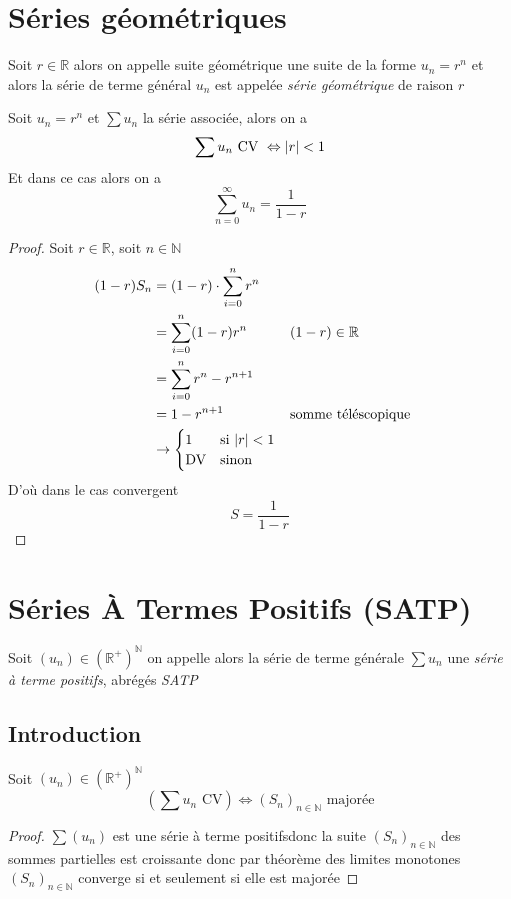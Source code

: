 \documentclass[11pt,colorlinks]{book}
\theoremstyle{mytheoremstyle}
\theoremstyle{mytheoremstyle}
\theoremstyle{mytheoremstyle}
\theoremstyle{mytheoremstyle}
\theoremstyle{mytheoremstyle}
\theoremstyle{mytheoremstyle}
\theoremstyle{mytheoremstyle}
\theoremstyle{mytheoremstyle}
\theoremstyle{myproblemstyle}
\def\mbb#1{\mathbb{#1}}
\def\bN{\mbb{N}}
\def\bR{\mbb{R}}
\def\rNp{\left(\bR^{+}\right)^{\bN}}
\def\satp{série à terme positifs}
\newcommand{\deq}[3]{\begin{cases}
    #1 & \text{si } #2 \\
    #3 & \text{sinon}
\end{cases}}
\begin{document}
\section{Séries géométriques}
\begin{definition}
  Soit $r \in \bR$ alors on appelle suite géométrique une suite de la forme $u_n = r^n$ et alors 
  la série de terme général $u_n$ est appelée \textit{série géométrique} de raison $r$
\end{definition}
\begin{theorem}
  Soit $u_n = r^n$ et $\sum u_n$ la série associée, alors on a 
  \begin{equation*}
    \sum u_n \text{ CV } \Leftrightarrow \abs{r} < 1 
  \end{equation*}
  Et dans ce cas alors on a 
  \begin{equation*}
    \sum_{n=0}^{\infty} u_n = \frac{1}{1-r}
  \end{equation*}
  \begin{proof}
    Soit $r \in \bR$, soit $n \in \bN$ 
    \begin{align*}
      (1-r)S_n &= (1-r)\cdot \sum_{i=0}^n r^n \\
               &= \sum_{i=0}^n (1-r)r^n && (1-r) \in \bR \\ 
               &= \sum_{i=0}^n r^n - r^{n+1} \\ 
               &= 1 - r^{n+1} && \text{somme téléscopique} \\
               &\to \deq{1}{\abs{r} < 1}{\text{DV}}
  \end{align*}
  D'où dans le cas convergent 
  \begin{equation*}
    S = \frac{1}{1-r}
  \end{equation*}
  \end{proof}
\end{theorem}
\section{Séries À Termes Positifs (SATP)}
\begin{definition}
  Soit $(u_n) \in \rNp$ on appelle alors la série de terme générale $\sum u_n$ une \textit{série à terme positifs}, abrégés \textit{SATP}
\end{definition}
\subsection{Introduction}
\begin{prop}
  Soit $(u_n) \in \rNp$ 
  \begin{equation*}
    \left(\sum u_n \text{ CV}\right) \Leftrightarrow (S_n)_{n\in \bN} \text{ majorée}
  \end{equation*}
  \begin{proof}
    $\sum (u_n)$ est une \satp donc la suite $(S_n)_{n\in \bN}$ des sommes partielles est croissante donc par 
    théorème des limites monotones $(S_n)_{n\in \bN}$ converge si et seulement si elle est majorée
  \end{proof}
\end{prop}
\end{document}
